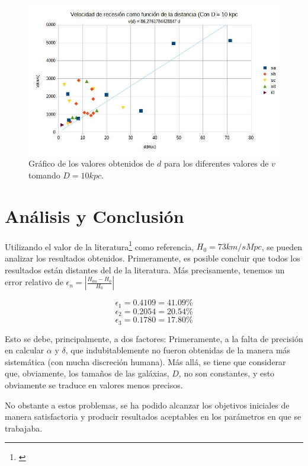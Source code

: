\documentclass[a4paper,12pt]{article}
\begin{document}
\begin{figure}[H]
    \includegraphics[width=\textwidth]{g3.jpg}
    \caption{Gráfico de los valores obtenidos de $d$ para los diferentes valores de $v$ tomando $D=10kpc$.}
    \label{fig:H3}
\end{figure}



\section{Análisis y Conclusión}

Utilizando el valor de la literatura\footnote{\cite{hubble}} como referencia, $H_0 = 73 km/s Mpc$,
se pueden analizar los resultados obtenidos. Primeramente, es posible concluir que todos los
resultados están distantes del de la literatura. Más precisamente, tenemos un error relativo de
$\epsilon_n = \left| \frac{H_{0n}-H_{0}}{H_0}\right|$

    $$\epsilon_1 = 0.4109 = 41.09\%$$
    $$\epsilon_2 = 0.2054 = 20.54 \%$$ 
    $$\epsilon_3 = 0.1780 = 17.80 \%$$ 


Esto se debe, principalmente, a dos factores: Primeramente, a la falta de precisión en calcular 
$\alpha$ y $\delta$, que indubitablemente no fueron obtenidas de la manera más sistemática 
(con mucha discreción humana). Más allá, se tiene que considerar que, obviamente, los tamaños 
de las galáxias, $D$, no son constantes, y esto obviamente se traduce en valores menos precisos.

No obstante a estos problemas, se ha podido alcanzar los objetivos iniciales de manera satisfactoria 
y producir resultados aceptables en los parámetros en que se trabajaba.

\printbibliography
\end{document}
